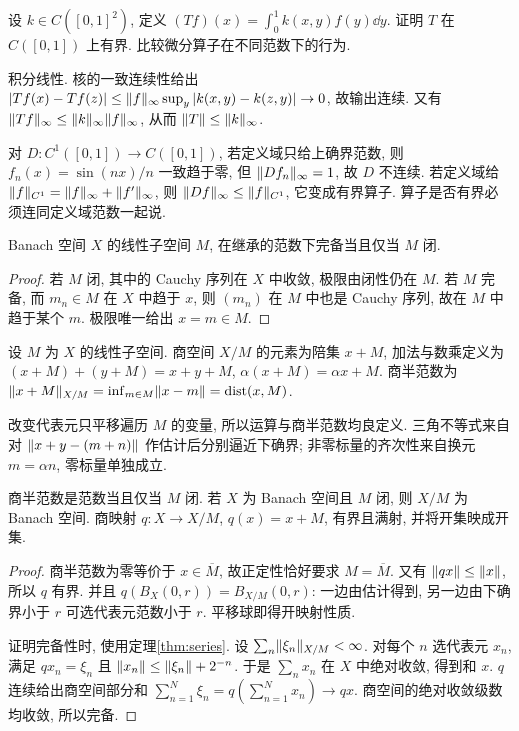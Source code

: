 \begin{example}\label{legacy:ch02:example1}
设 $k\in C([0,1]^2)$, 定义 $(Tf)(x)=\int_0^1 k(x,y)f(y)\dd y$. 证明 $T$ 在 $C([0,1])$ 上有界. 比较微分算子在不同范数下的行为.
\end{example}
\begin{solution}
积分线性. 核的一致连续性给出
$|Tf(x)-Tf(z)|\le\lVert f\rVert_\infty\sup_y|k(x,y)-k(z,y)|\to0$, 故输出连续. 又有 $\lVert Tf\rVert_\infty\le\lVert k\rVert_\infty\lVert f\rVert_\infty$, 从而 $\lVert T\rVert\le\lVert k\rVert_\infty$.

对 $D:C^1([0,1])\to C([0,1])$, 若定义域只给上确界范数, 则 $f_n(x)=\sin(nx)/n$ 一致趋于零, 但 $\lVert Df_n\rVert_\infty=1$, 故 $D$ 不连续. 若定义域给 $\lVert f\rVert_{C^1}=\lVert f\rVert_\infty+\lVert f'\rVert_\infty$, 则 $\lVert Df\rVert_\infty\le\lVert f\rVert_{C^1}$, 它变成有界算子. 算子是否有界必须连同定义域范数一起说.
\end{solution}

\begin{proposition}\label{prop:closedsubspace}
Banach 空间 $X$ 的线性子空间 $M$, 在继承的范数下完备当且仅当 $M$ 闭.
\end{proposition}
\begin{proof}
若 $M$ 闭, 其中的 Cauchy 序列在 $X$ 中收敛, 极限由闭性仍在 $M$. 若 $M$ 完备, 而 $m_n\in M$ 在 $X$ 中趋于 $x$, 则 $(m_n)$ 在 $M$ 中也是 Cauchy 序列, 故在 $M$ 中趋于某个 $m$. 极限唯一给出 $x=m\in M$.
\end{proof}

\begin{definition}
设 $M$ 为 $X$ 的线性子空间. 商空间 $X/M$ 的元素为陪集 $x+M$, 加法与数乘定义为 $(x+M)+(y+M)=x+y+M$, $\alpha(x+M)=\alpha x+M$. 商半范数为 $\lVert x+M\rVert_{X/M}=\inf_{m\in M}\lVert x-m\rVert=\operatorname{dist}(x,M)$.
\end{definition}
改变代表元只平移遍历 $M$ 的变量, 所以运算与商半范数均良定义. 三角不等式来自对 $\lVert x+y-(m+n)\rVert$ 作估计后分别逼近下确界; 非零标量的齐次性来自换元 $m=\alpha n$, 零标量单独成立.

\begin{theorem}\label{thm:quotient}
商半范数是范数当且仅当 $M$ 闭. 若 $X$ 为 Banach 空间且 $M$ 闭, 则 $X/M$ 为 Banach 空间. 商映射 $q:X\to X/M$, $q(x)=x+M$, 有界且满射, 并将开集映成开集.
\end{theorem}
\begin{proof}
商半范数为零等价于 $x\in\overline M$, 故正定性恰好要求 $M=\overline M$. 又有 $\lVert qx\rVert\le\lVert x\rVert$, 所以 $q$ 有界. 并且 $q(B_X(0,r))=B_{X/M}(0,r)$: 一边由估计得到, 另一边由下确界小于 $r$ 可选代表元范数小于 $r$. 平移球即得开映射性质.

证明完备性时, 使用定理\ref{thm:series}. 设 $\sum_n\lVert \xi_n\rVert_{X/M}<\infty$. 对每个 $n$ 选代表元 $x_n$, 满足 $qx_n=\xi_n$ 且 $\lVert x_n\rVert\le\lVert \xi_n\rVert+2^{-n}$. 于是 $\sum_nx_n$ 在 $X$ 中绝对收敛, 得到和 $x$. $q$ 连续给出商空间部分和 $\sum_{n=1}^N\xi_n=q(\sum_{n=1}^Nx_n)\to qx$. 商空间的绝对收敛级数均收敛, 所以完备.
\end{proof}

